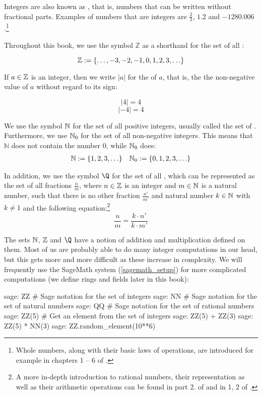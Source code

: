 Integers are also known as , that is, numbers that can be written without fractional parts. Examples of numbers that are  integers are $\frac{2}{3}$, $1.2$ and $-1280.006$.\footnote{Whole numbers, along with their basic laws of operations, are introduced for example in chapters 1 – 6 of \cite{wu-1}.}

Throughout this book, we use the symbol $\mathbb{Z}$ as a shorthand for the set of all :

\begin{equation}
\label{integer_symbol}
\mathbb{Z} := \{\ldots, -3,-2,-1,0,1,2,3,\ldots\}
\end{equation}

If $a\in \mathbb{Z}$ is an integer, then we write $|a|$ for the  of $a$, that is, the the non-negative value of $a$ without regard to its sign:

\begin{equation}
|4|= 4
\end{equation}
\begin{equation}
|-4|= 4
\end{equation}

We use the symbol $\mathbb{N}$ for the set of all positive integers, usually called the set of . Furthermore, we use $\mathbb{N}_0$ for the set of all non-negative integers. This means that $\mathbb{N}$ does not contain the number $0$, while $\mathbb{N}_0$ does:
\begin{align*}
\label{natural_symbol}
\mathbb{N} := \{1,2,3,\ldots\} & & \mathbb{N}_0 := \{0,1,2,3,\ldots\}
\end{align*}

In addition, we use the symbol $\Q$ for the set of all , which can be represented as the set of all fractions $\frac{n}{m}$, where $n\in \mathbb{Z}$ is an integer and $m\in \mathbb{N}$ is a natural number, such that there is no other fraction $\frac{n'}{m'}$ and natural number $k\in \mathbb{N}$ with $k\neq 1$ and the following equation:\footnote{A more in-depth introduction to rational numbers, their representation as well as their arithmetic operations can be found in part 2. of \cite{wu-1} and in \chaptname{} 1, \secname{} 2 of \cite{mignotte-1992}.}
\begin{equation}
\frac{n}{m} = \frac{k\cdot n'}{k\cdot m'}
\end{equation}

The sets $\mathbb{N}$, $\mathbb{Z}$ and $\Q$ have a notion of addition and multiplication defined on them. Most of us are probably able to do many integer computations in our head, but this gets more and more difficult as these increase in complexity.  We will frequently use the  SageMath system (\ref{sagemath_setup}) for more complicated computations (we define rings and fields later in this book):
\begin{sagecommandline}
sage: ZZ #  Sage notation for the set of integers
sage: NN # Sage notation for the set of natural numbers
sage: QQ # Sage notation for the set of rational numbers
sage: ZZ(5) # Get an element from the set of integers
sage: ZZ(5) + ZZ(3)
sage: ZZ(5) * NN(3)
sage: ZZ.random_element(10**6)
\end{sagecommandline}

